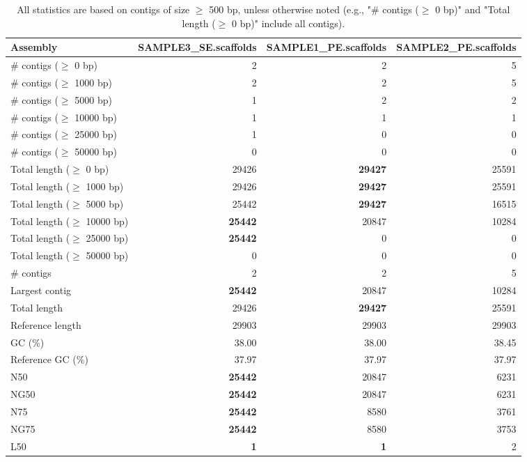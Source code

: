 \documentclass[12pt,a4paper]{article}
\begin{document}
\begin{table}[ht]
\begin{center}
\caption{All statistics are based on contigs of size $\geq$ 500 bp, unless otherwise noted (e.g., "\# contigs ($\geq$ 0 bp)" and "Total length ($\geq$ 0 bp)" include all contigs).}
\begin{tabular}{|l*{3}{|r}|}
\hline
Assembly & SAMPLE3\_SE.scaffolds & SAMPLE1\_PE.scaffolds & SAMPLE2\_PE.scaffolds \\ \hline
\# contigs ($\geq$ 0 bp) & 2 & 2 & 5 \\ \hline
\# contigs ($\geq$ 1000 bp) & 2 & 2 & 5 \\ \hline
\# contigs ($\geq$ 5000 bp) & 1 & 2 & 2 \\ \hline
\# contigs ($\geq$ 10000 bp) & 1 & 1 & 1 \\ \hline
\# contigs ($\geq$ 25000 bp) & 1 & 0 & 0 \\ \hline
\# contigs ($\geq$ 50000 bp) & 0 & 0 & 0 \\ \hline
Total length ($\geq$ 0 bp) & 29426 & {\bf 29427} & 25591 \\ \hline
Total length ($\geq$ 1000 bp) & 29426 & {\bf 29427} & 25591 \\ \hline
Total length ($\geq$ 5000 bp) & 25442 & {\bf 29427} & 16515 \\ \hline
Total length ($\geq$ 10000 bp) & {\bf 25442} & 20847 & 10284 \\ \hline
Total length ($\geq$ 25000 bp) & {\bf 25442} & 0 & 0 \\ \hline
Total length ($\geq$ 50000 bp) & 0 & 0 & 0 \\ \hline
\# contigs & 2 & 2 & 5 \\ \hline
Largest contig & {\bf 25442} & 20847 & 10284 \\ \hline
Total length & 29426 & {\bf 29427} & 25591 \\ \hline
Reference length & 29903 & 29903 & 29903 \\ \hline
GC (\%) & 38.00 & 38.00 & 38.45 \\ \hline
Reference GC (\%) & 37.97 & 37.97 & 37.97 \\ \hline
N50 & {\bf 25442} & 20847 & 6231 \\ \hline
NG50 & {\bf 25442} & 20847 & 6231 \\ \hline
N75 & {\bf 25442} & 8580 & 3761 \\ \hline
NG75 & {\bf 25442} & 8580 & 3753 \\ \hline
L50 & {\bf 1} & {\bf 1} & 2 \\ \hline

\end{tabular}
\end{center}
\end{table}
\end{document}
